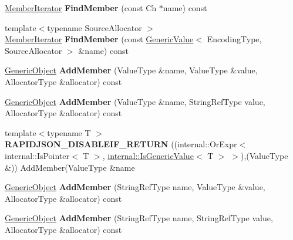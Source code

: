 \begin{DoxyCompactItemize}
\item 
\hyperlink{class_generic_member_iterator}{Member\+Iterator} {\bfseries Find\+Member} (const Ch $\ast$name) const \hypertarget{class_generic_object_a6713425c66b7f05e4ac5d251a8f5b708}{}\label{class_generic_object_a6713425c66b7f05e4ac5d251a8f5b708}

\item 
{\footnotesize template$<$typename Source\+Allocator $>$ }\\\hyperlink{class_generic_member_iterator}{Member\+Iterator} {\bfseries Find\+Member} (const \hyperlink{class_generic_value}{Generic\+Value}$<$ Encoding\+Type, Source\+Allocator $>$ \&name) const \hypertarget{class_generic_object_a3eca7c61d4d2b728de83ffdb1f35e45a}{}\label{class_generic_object_a3eca7c61d4d2b728de83ffdb1f35e45a}

\item 
\hyperlink{class_generic_object}{Generic\+Object} {\bfseries Add\+Member} (Value\+Type \&name, Value\+Type \&value, Allocator\+Type \&allocator) const \hypertarget{class_generic_object_a59554f8232c7c2a74d8043f4b4b20ec2}{}\label{class_generic_object_a59554f8232c7c2a74d8043f4b4b20ec2}

\item 
\hyperlink{class_generic_object}{Generic\+Object} {\bfseries Add\+Member} (Value\+Type \&name, String\+Ref\+Type value, Allocator\+Type \&allocator) const \hypertarget{class_generic_object_a33df672a1ecafa47c2d7ed3c765738c1}{}\label{class_generic_object_a33df672a1ecafa47c2d7ed3c765738c1}

\item 
{\footnotesize template$<$typename T $>$ }\\{\bfseries R\+A\+P\+I\+D\+J\+S\+O\+N\+\_\+\+D\+I\+S\+A\+B\+L\+E\+I\+F\+\_\+\+R\+E\+T\+U\+RN} ((internal\+::\+Or\+Expr$<$ internal\+::\+Is\+Pointer$<$ T $>$, \hyperlink{structinternal_1_1_is_generic_value}{internal\+::\+Is\+Generic\+Value}$<$ T $>$ $>$),(Value\+Type \&)) Add\+Member(Value\+Type \&name\hypertarget{class_generic_object_a98ebcec632c41442d89cd8634b7ecc47}{}\label{class_generic_object_a98ebcec632c41442d89cd8634b7ecc47}

\item 
\hyperlink{class_generic_object}{Generic\+Object} {\bfseries Add\+Member} (String\+Ref\+Type name, Value\+Type \&value, Allocator\+Type \&allocator) const \hypertarget{class_generic_object_a245647b72d87ffe6142d1c656f0e92d8}{}\label{class_generic_object_a245647b72d87ffe6142d1c656f0e92d8}

\item 
\hyperlink{class_generic_object}{Generic\+Object} {\bfseries Add\+Member} (String\+Ref\+Type name, String\+Ref\+Type value, Allocator\+Type \&allocator) const \hypertarget{class_generic_object_a5cb6c166992abe5674a287bbc02d8f2f}{}\label{class_generic_object_a5cb6c166992abe5674a287bbc02d8f2f}


\end{DoxyCompactItemize}
